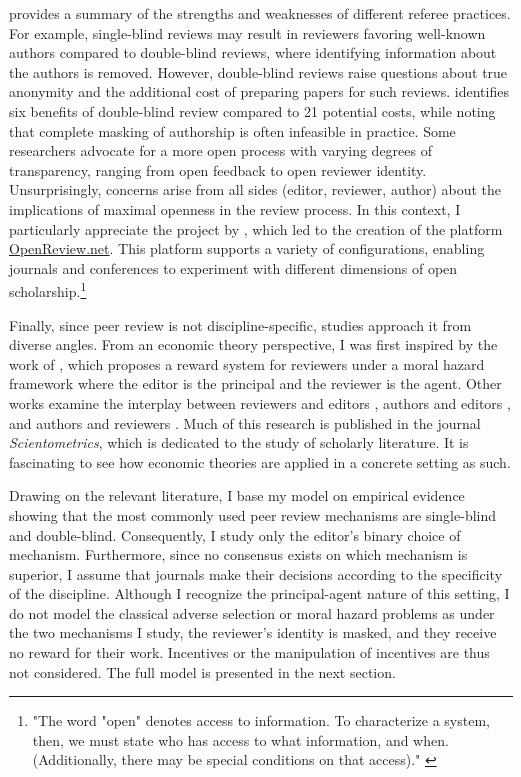 \documentclass[12pt]{article}
\begin{document}
\citet{tan2018peer} provides a summary of the strengths and weaknesses of different referee practices. For example, single-blind reviews may result in reviewers favoring well-known authors compared to double-blind reviews, where identifying information about the authors is removed. However, double-blind reviews raise questions about true anonymity and the additional cost of preparing papers for such reviews. \citet{snodgrass2007single} identifies six benefits of double-blind review compared to 21 potential costs, while noting that complete masking of authorship is often infeasible in practice. Some researchers advocate for a more open process with varying degrees of transparency, ranging from open feedback to open reviewer identity. Unsurprisingly, concerns arise from all sides (editor, reviewer, author) about the implications of maximal openness in the review process. In this context, I particularly appreciate the project by \citet{soergel2013open}, which led to the creation of the platform \href{https://openreview.net/}{OpenReview.net}. This platform supports a variety of configurations, enabling journals and conferences to experiment with different dimensions of open scholarship.\footnote{"The word "open" denotes access to information. To characterize a system, then, we must state who has access to what information, and when. (Additionally, there may be special conditions on that access)." \citet{soergel2013open}}

Finally, since peer review is not discipline-specific, studies approach it from
diverse angles. From an economic theory perspective, I was first inspired by
the work of \citet{garcia2015principal}, which proposes a reward system for
reviewers under a moral hazard framework where the editor is the principal and
the reviewer is the agent. Other works examine the interplay between reviewers
and editors \citep{garcia2021interplay}, authors and editors
\citep{garcia2022fraud}, and authors and reviewers
\citep{radzvilas2023incentives}. Much of this research is published in the
journal \textit{Scientometrics}, which is dedicated to the study of scholarly
literature. It is fascinating to see how economic theories are applied in a
concrete setting as such.

Drawing on the relevant literature, I base my model on empirical evidence
showing that the most commonly used peer review mechanisms are single-blind and
double-blind. Consequently, I study only the editor's binary choice of
mechanism. Furthermore, since no consensus exists on which mechanism is
superior, I assume that journals make their decisions according to the
specificity of the discipline. Although I recognize the principal-agent nature
of this setting, I do not model the classical adverse selection or moral hazard
problems as under the two mechanisms I study, the reviewer's identity is
masked, and they receive no reward for their work. Incentives or the
manipulation of incentives are thus not considered. The full model is presented
in the next section.
\end{document}
